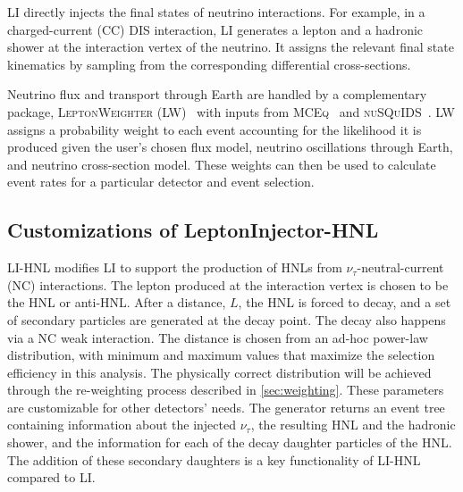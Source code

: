 \documentclass[
    aps,
    prd,
    reprint,
    amsmath,
    amssymb,
    nofootinbib,
    linenumbers,
    superscriptaddress,
    floatfix
]{revtex4-2}
\begin{document}
LI directly injects the final states of neutrino interactions. For example, in a charged-current (CC) DIS interaction, LI generates a lepton and a hadronic shower at the interaction vertex of the neutrino. It assigns the relevant final state kinematics by sampling from the corresponding differential cross-sections.

Neutrino flux and transport through Earth are handled by a complementary package, \textsc{LeptonWeighter} (LW)~\cite{IceCube:2020tcq} with inputs from \textsc{MCEq}~\cite{Fedynitch:2018cbl} and \textsc{nuSQuIDS}~\cite{Arguelles:2021twb}.
LW assigns a probability weight to each event accounting for the likelihood it is produced given the user's chosen flux model, neutrino oscillations through Earth, and neutrino cross-section model.
These weights can then be used to calculate event rates for a particular detector and event selection.


\subsection{Customizations of LeptonInjector-HNL}

LI-HNL modifies LI to support the production of HNLs from $\nu_\tau$-neutral-current (NC) interactions. 
The lepton produced at the interaction vertex is chosen to be the HNL or anti-HNL. 
After a distance, $L$,  the HNL is forced to decay, and a set of secondary particles are generated at the decay point. The decay also happens via a NC weak interaction.
The distance is chosen from an ad-hoc power-law distribution, with minimum and maximum values that maximize the selection efficiency in this analysis. The physically correct distribution will be achieved through the re-weighting process described in \cref{sec:weighting}.
These parameters are customizable for other detectors' needs.
The generator returns an event tree containing information about the injected $\nu_\tau$, the resulting HNL and the hadronic shower, and the information for each of the decay daughter particles of the HNL.
The addition of these secondary daughters is a key functionality of LI-HNL compared to LI.
\end{document}
